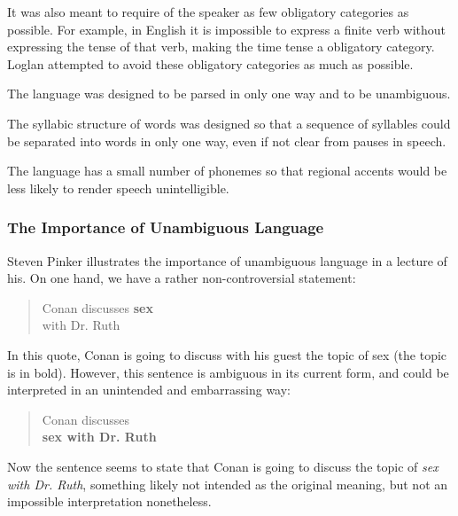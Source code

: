 \documentclass[12pt]{book}
\begin{document}
It was also meant to require of the speaker as few obligatory categories as possible. For example, in English it is impossible to express a finite verb without expressing the tense of that verb, making the time tense a obligatory category. Loglan attempted to avoid these obligatory categories as much as possible. 


The language was designed to be parsed in only one way and to be unambiguous. 

The syllabic structure of words was designed so that a sequence of syllables could be separated into words in only one way, even if not clear from pauses in speech. 

The language has a small number of phonemes so that regional accents would be less likely to render speech unintelligible. 


\subsubsection{The Importance of Unambiguous Language}


Steven Pinker illustrates the importance of unambiguous language in a lecture of his. On one hand, we have a rather non-controversial statement: 

\begin{quote}
Conan discusses \textbf{sex} \\
with Dr. Ruth
\end{quote}

In this quote, Conan is going to discuss with his guest the topic of sex (the topic is in bold). However, this sentence is ambiguous in its current form, and could be interpreted in an unintended and embarrassing way:
 
\begin{quote}
Conan discusses \\
\textbf{sex with Dr. Ruth}
\end{quote}

Now the sentence seems to state that Conan is going to discuss the topic of \emph{sex with Dr. Ruth}, something likely not intended as the original meaning, but not an impossible interpretation nonetheless. \cite[22:58]{PinkerWindow}

\end{document}
